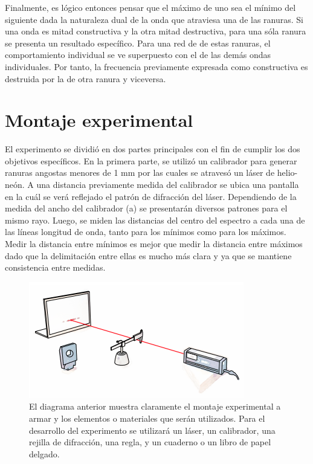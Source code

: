 \documentclass[%
 reprint,
 amsmath,amssymb,
 aps,
]{revtex4-1}
\begin{document}
Finalmente, es lógico entonces pensar que el máximo de uno sea el mínimo del siguiente dada la naturaleza dual de la onda que atraviesa una de las ranuras. Si una onda es mitad constructiva y la otra mitad destructiva, para una sóla ranura se presenta un resultado específico. Para una red de de estas ranuras, el comportamiento individual se ve superpuesto con el de las demás ondas individuales. Por tanto, la frecuencia previamente expresada como constructiva es destruida por la de otra ranura y viceversa. 

\section{\label{montaje} Montaje experimental}

El experimento se dividió en dos partes principales con el fin de cumplir los dos objetivos específicos. En la primera parte, se utilizó un calibrador para generar ranuras angostas menores de 1 mm por las cuales se atravesó un láser de helio-neón. A una distancia previamente medida del calibrador se ubica una pantalla en la cuál se verá reflejado el patrón de difracción del láser. Dependiendo de la medida del ancho del calibrador (a) se presentarán diversos patrones para el mismo rayo. Luego, se miden las distancias del centro del espectro a cada una de las líneas longitud de onda, tanto para los mínimos como para los máximos. Medir la distancia entre mínimos es mejor que medir la distancia entre máximos dado que la delimitación entre ellas es mucho más clara y ya que se mantiene consistencia entre medidas.

\begin{figure}[H]
    \centering
    \includegraphics[scale= 0.5]{Montaje.png}
    \caption{El diagrama anterior muestra claramente el montaje experimental a armar y los elementos o materiales que serán utilizados. Para el desarrollo del experimento se utilizará un láser, un calibrador, una rejilla de difracción, una regla, y un cuaderno o un libro de papel delgado.}
    \label{fig:montaje}
\end{figure}
\end{document}
